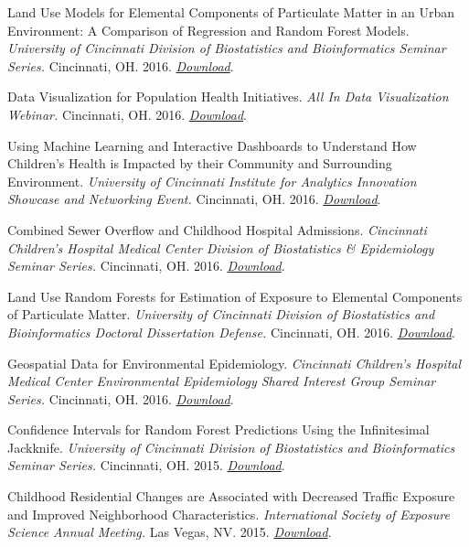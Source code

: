 Land Use Models for Elemental Components of Particulate Matter in an
Urban Environment: A Comparison of Regression and Random Forest Models.
\emph{University of Cincinnati Division of Biostatistics and
Bioinformatics Seminar Series.} Cincinnati, OH. 2016.
\emph{\href{http://colebrokamp-website.s3.amazonaws.com/talks/LUR_vs_LURF_Cole_Brokamp.pdf}{Download}}.

Data Visualization for Population Health Initiatives. \emph{All In Data
Visualization Webinar.} Cincinnati, OH. 2016.
\emph{\href{http://colebrokamp-website.s3.amazonaws.com/talks/all_in_webinar_Beck_Brokamp.pdf}{Download}}.

Using Machine Learning and Interactive Dashboards to Understand How
Children's Health is Impacted by their Community and Surrounding
Environment. \emph{University of Cincinnati Institute for Analytics
Innovation Showcase and Networking Event.} Cincinnati, OH. 2016.
\emph{\href{http://colebrokamp-website.s3.amazonaws.com/talks/data_analytics_showcase_cole_brokamp.pdf}{Download}}.

Combined Sewer Overflow and Childhood Hospital Admissions.
\emph{Cincinnati Children's Hospital Medical Center Division of
Biostatistics \& Epidemiology Seminar Series.} Cincinnati, OH. 2016.
\emph{\href{http://colebrokamp-website.s3.amazonaws.com/talks/Combined\%20Sewer\%20Overflow\%20and\%20Hospital\%20Admissions.pdf}{Download}}.

Land Use Random Forests for Estimation of Exposure to Elemental
Components of Particulate Matter. \emph{University of Cincinnati
Division of Biostatistics and Bioinformatics Doctoral Dissertation
Defense.} Cincinnati, OH. 2016.
\emph{\href{http://colebrokamp-website.s3.amazonaws.com/talks/Cole\%20Brokamp\%20Dissertation\%20Defense\%2023March2016.pdf}{Download}}.

Geospatial Data for Environmental Epidemiology. \emph{Cincinnati
Children's Hospital Medical Center Environmental Epidemiology Shared
Interest Group Seminar Series.} Cincinnati, OH. 2016.
\emph{\href{http://colebrokamp-website.s3.amazonaws.com/talks/GIS_env_epi.pdf}{Download}}.

Confidence Intervals for Random Forest Predictions Using the
Infinitesimal Jackknife. \emph{University of Cincinnati Division of
Biostatistics and Bioinformatics Seminar Series.} Cincinnati, OH. 2015.
\emph{\href{http://colebrokamp-website.s3.amazonaws.com/talks/Confidence_Intervals_for_Random_Forest_Predictions_Using_the_Infinitesimal_Jackknife.pdf}{Download}}.

Childhood Residential Changes are Associated with Decreased Traffic
Exposure and Improved Neighborhood Characteristics. \emph{International
Society of Exposure Science Annual Meeting.} Las Vegas, NV. 2015.
\emph{\href{http://colebrokamp-website.s3.amazonaws.com/talks/Cole_Brokamp_ISES_2015.pdf}{Download}}.

